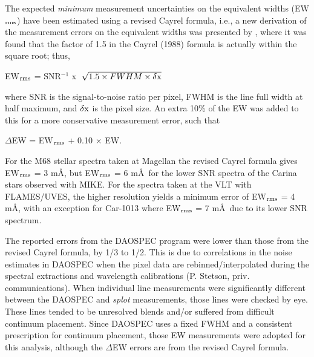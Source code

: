\documentclass{emulateapj}
\begin{document}
 
The expected {\it minimum} measurement uncertainties on the equivalent 
widths (EW$_{\rm rms}$) have been estimated using a revised Cayrel formula,
i.e., a new derivation of the measurement errors on the equivalent 
widths was presented by \citet{Bat08}, where it was 
found that the factor of 1.5 in the Cayrel (1988) formula is actually 
within the square root; thus,

\vspace{0.1in}
EW$_{\rm rms}$ = SNR$^{-1}$ x \ $\sqrt[]{1.5 \times FWHM \times \delta{\rm x}}$
\vspace{0.1in}


\noindent
where SNR is the signal-to-noise ratio per pixel, FWHM is the line full
width at half maximum, and $\delta{\rm x}$ is the pixel size.
An extra 10\% of the EW was added to this for a more conservative 
measurement error, such that 

\vspace{0.1in}
$\Delta$EW = EW$_{\rm rms}$ + 0.10 $\times$ EW.
\vspace{0.1in}

\noindent

For the M68 stellar spectra taken at Magellan the revised 
Cayrel formula gives EW$_{\rm rms}$ = 3 m\AA, but EW$_{\rm rms}$ = 6 m\AA\
for the lower SNR spectra of the Carina stars observed with MIKE. 
For the spectra taken at the VLT with FLAMES/UVES, 
the higher resolution yields a minimum error of
EW$_{\rm rms}$ = 4 m\AA, with an exception for Car-1013 where
EW$_{\rm rms}$ = 7 m\AA\ due to its lower SNR spectrum.    


The reported errors from the DAOSPEC program were lower than 
those from the revised Cayrel formula, by 1/3 to 1/2.  This
is due to correlations in the noise estimates in DAOSPEC 
when the pixel data are rebinned/interpolated during the
spectral extractions and wavelength calibrations
(P. Stetson, priv. communications). 
%
When individual line measurements were significantly different 
between the DAOSPEC and {\it splot} measurements, those lines 
were checked by eye.   These lines tended to be unresolved
blends and/or suffered from difficult continuum placement.
Since DAOSPEC uses a fixed FWHM and a consistent prescription 
for continuum placement, those EW measurements were adopted for 
this analysis, although the $\Delta$EW errors are from the revised Cayrel formula.
  
\end{document}
